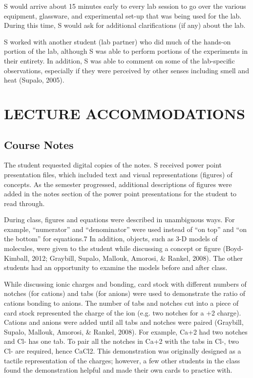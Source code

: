 \documentclass[11.5pt]{sig-alternate} %
\begin{document}
\begin{large}
S would arrive about 15 minutes early to every lab session to go over the various equipment, glassware, and experimental set-up that was being used for the lab.  During this time, S would ask for additional clarifications (if any) about the lab.  

S worked with another student (lab partner) who did much of the hands-on portion of the lab, although S was able to perform portions of the experiments in their entirety. In addition, S was able to comment on some of the lab-specific observations, especially if they were perceived by other senses including smell and heat (Supalo, 2005).

\section*{LECTURE ACCOMMODATIONS}

\subsection*{Course Notes}

The student requested digital copies of the notes.  S received power point presentation files, which included text and visual representations (figures) of concepts.  As the semester progressed, additional descriptions of figures were added in the notes section of the power point presentations for the student to read through.  

During class, figures and equations were described in unambiguous ways.  For example, “numerator” and “denominator” were used instead of “on top” and “on the bottom” for equations.7 In addition, objects, such as 3-D models of molecules, were given to the student while discussing a concept or figure (Boyd-Kimball, 2012; Graybill, Supalo, Mallouk, Amorosi, \& Rankel, 2008).  The other students had an opportunity to examine the models before and after class.

While discussing ionic charges and bonding, card stock with different numbers of notches (for cations) and tabs (for anions) were used to demonstrate the ratio of cations bonding to anions.  The number of tabs and notches cut into a piece of card stock represented the charge of the ion (e.g. two notches for a +2 charge).  Cations and anions were added until all tabs and notches were paired (Graybill, Supalo, Mallouk, Amorosi, \& Rankel, 2008).  For example, Ca+2 had two notches and Cl- has one tab.  To pair all the notches in Ca+2 with the tabs in Cl-, two Cl- are required, hence CaCl2.  This demonstration was originally designed as a tactile representation of the charges; however, a few other students in the class found the demonstration helpful and made their own cards to practice with.


\end{large}
\end{document}
